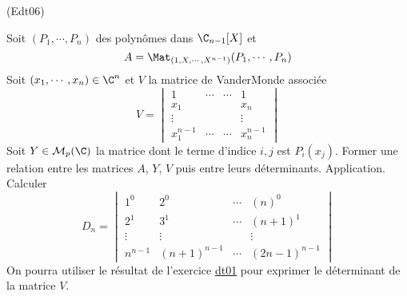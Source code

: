 \begin{tiny}(Edt06)\end{tiny}
Soit $(P_{1},\cdots ,P_{n})$ des polyn{\^o}mes dans $\C_{n-1}[X]$ et
\begin{displaymath}
 A = \Mat_{(1,X,\cdots,X^{n-1})}(P_{1},\cdots ,P_{n})
\end{displaymath}
Soit $(x_{1},\cdots ,x_{n})\in \C^{n}$ et $V$ la matrice de VanderMonde associée 
\begin{displaymath}
V =
\begin{vmatrix}
1 & \cdots  & \cdots  & 1 \\
x_{1} &  &  & x_{n} \\
\vdots  &  &  & \vdots  \\
x_{1}^{n-1} & \cdots  & \cdots  & x_{n}^{n-1}
\end{vmatrix}
\end{displaymath}
Soit $Y\in \mathcal{M}_p(\C)$ la matrice dont le terme d'indice $i,j$ est $P_{i}(x_{j})$.\newline
Former une relation entre les matrices $A$, $Y$, $V$ puis entre leurs déterminants.\newline
Application. Calculer
\begin{displaymath}
 D_n =
\begin{vmatrix}
 1^0     & 2^0         & \cdots & (n)^0 \\
 2^1     & 3^1         & \cdots & (n+1)^1 \\
 \vdots  & \vdots      &        & \vdots \\
 n^{n-1} & (n+1)^{n-1} & \cdots & (2n-1)^{n-1}
\end{vmatrix}
\end{displaymath}
On pourra utiliser le résultat de l'exercice \href{\exosurl Wdt01.html}{dt01} pour exprimer le déterminant de la matrice $V$.